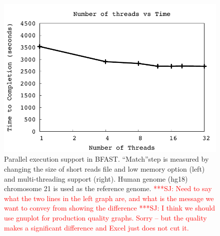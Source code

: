 \documentclass[12pt]{article}
\newcommand{\jhanote}[1]{ {\textcolor{red}     {***SJ: #1}}}
\newcommand{\jhanote}[1]{}
\begin{document}
 \begin{figure}
 \centering
\includegraphics[scale=0.66]{figures/threadsvstime.pdf} 

\caption{\small Parallel execution support in BFAST.  ``Match''step is measured by changing the size of short reads file and low memory option (left) and multi-threading support (right).  Human genome (hg18) chromosome 21 is used as the reference genome. \jhanote{Need to say what the two lines in the left graph are, and what is the message we want to convey from showing the difference} \jhanote{I think we should use gnuplot for production quality graphs. Sorry -- but the quality makes a significant difference and Excel just does not cut it.}}
  \label{fig:parallel-execution} 
 \end{figure}
\end{document}
